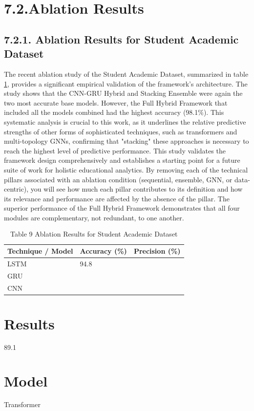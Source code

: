 \documentclass[twocolumn]{svjour3}
\begin{document}
\section{7.2.Ablation Results}
\subsection{7.2.1. Ablation Results for Student Academic Dataset}
The recent ablation study of the Student Academic Dataset, summarized in table \ref{tab:table9}, provides a significant empirical validation of the framework's architecture. The study shows that the CNN-GRU Hybrid and Stacking Ensemble were again the two most accurate base models. However, the Full Hybrid Framework that included all the models combined had the highest accuracy (98.1\%). This systematic analysis is crucial to this work, as it underlines the relative predictive strengths of other forms of sophisticated techniques, such as transformers and multi-topology GNNs, confirming that "stacking" these approaches is necessary to reach the highest level of predictive performance. This study validates the framework design comprehensively and establishes a starting point for a future suite of work for holistic educational analytics. By removing each of the technical pillars associated with an ablation condition (sequential, ensemble, GNN, or data-centric), you will see how much each pillar contributes to its definition and how its relevance and performance are affected by the absence of the pillar. The superior performance of the Full Hybrid Framework demonstrates that all four modules are complementary, not redundant, to one another.
\begin{table}
\centering
\caption{Table 9 Ablation Results for Student Academic Dataset}
\label{tab:table9}
\begin{tabular}{lll}
\hline
Technique / Model & Accuracy (\%) & Precision (\%) \\
\hline
LSTM & 94.8 & \\
GRU & & \\
CNN & & \\
\hline
\end{tabular}
\end{table}

\section{Results}
89.1
\section{Model}
Transformer
\end{document}
